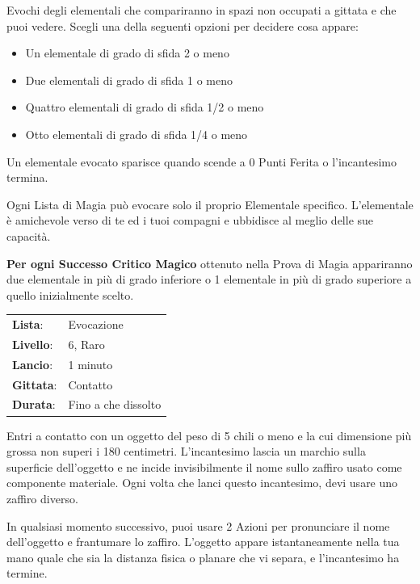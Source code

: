 \begin{multicols}{2}
Evochi degli elementali che compariranno in spazi non occupati a gittata e che puoi vedere. Scegli una della seguenti opzioni per decidere cosa appare:

\begin{itemize}[leftmargin=*] \setlength{\itemsep}{-1pt}
	\item Un elementale di grado di sfida 2 o meno
	\item Due elementali di grado di sfida 1 o meno
	\item Quattro elementali di grado di sfida 1/2 o meno
	\item Otto elementali di grado di sfida 1/4 o meno
\end{itemize}

Un elementale evocato sparisce quando scende a 0 Punti Ferita o l'incantesimo termina.

Ogni Lista di Magia può evocare solo il proprio Elementale specifico. L'elementale è amichevole verso di te ed i tuoi compagni e ubbidisce al meglio delle sue capacità.

\textbf{Per ogni Successo Critico Magico} ottenuto nella Prova di Magia appariranno due elementale in più di grado inferiore o 1 elementale in più di grado superiore a quello inizialmente scelto.

\noindent\begin{tabularx}{\linewidth}{p{1.3cm}X}
	\rowcolor{gray!20}\textbf{Lista}: & Evocazione \\
	\textbf{Livello}: & 6, Raro \\
	\rowcolor{gray!20}\textbf{Lancio}: & 1 minuto \\
	\textbf{Gittata}: & Contatto \\
	\rowcolor{gray!20}\textbf{Durata}: & Fino a che dissolto \\
\end{tabularx}\smallskip

Entri a contatto con un oggetto del peso di 5 chili o meno e la cui dimensione più grossa non superi i 180 centimetri. L'incantesimo lascia un marchio sulla superficie dell'oggetto e ne incide invisibilmente il nome sullo zaffiro usato come componente materiale. Ogni volta che lanci questo incantesimo, devi usare uno zaffiro diverso.

In qualsiasi momento successivo, puoi usare 2 Azioni per pronunciare il nome dell'oggetto e frantumare lo zaffiro. L'oggetto appare istantaneamente nella tua mano quale che sia la distanza fisica o planare che vi separa, e l'incantesimo ha termine.


\end{multicols}
